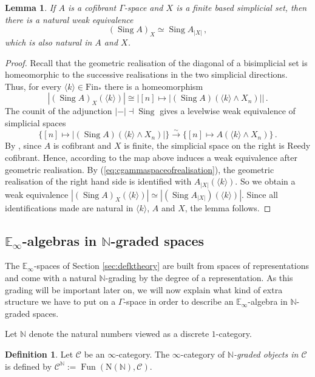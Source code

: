 \documentclass[oneside, a4paper, 12pt]{article}
\numberwithin{equation}{section}
\DeclareMathOperator{\Sing}{Sing}
\DeclareMathOperator{\Fun}{Fun}
\newcommand{\Fin}{\mathrm{Fin}}
\newcommand{\N}{\mathbb{N}}
\theoremstyle{plain}
\newtheorem{lemma}[theorem]{Lemma}
\theoremstyle{definition}
\newtheorem{definition}[theorem]{Definition}
\theoremstyle{remark}
\begin{document}
\begin{lemma} \label{lem:singular}
If $A$ is a cofibrant $\Gamma$-space and $X$ is a finite based simplicial set, then there is a natural weak equivalence
\[
(\Sing A)_X \simeq \Sing A_{|X|}\, ,
\]
which is also natural in $A$ and $X$.
\end{lemma}
\begin{proof}
Recall that the geometric realisation of the diagonal of a bisimplicial set is homeomorphic to the successive realisations in the two simplicial directions. Thus, for every $\langle k\rangle\in \Fin_\ast$ there is a homeomorphism
\[
|(\Sing A)_X(\langle k\rangle)|\cong |[n]\mapsto |(\Sing A)(\langle k\rangle\wedge X_n)||\, .
\]
The counit of the adjunction $|-|\dashv \Sing$ gives a levelwise weak equivalence of simplicial spaces
\[
\{ [n]\mapsto |(\Sing A)(\langle k\rangle\wedge X_n)|\} \xrightarrow{\sim} \{[n] \mapsto A(\langle k\rangle\wedge X_n)\}\, .
\]
By \cite[Proposition B.37]{Global}, since $A$ is cofibrant and $X$ is finite, the simplicial space on the right is Reedy cofibrant. Hence, according to \cite[Proposition A.44]{Global} the map above induces a weak equivalence after geometric realisation. By (\ref{eq:cgammaspaceofrealisation}), the geometric realisation of the right hand side is identified with $A_{|X|}(\langle k\rangle)$. So we obtain a weak equivalence $|(\Sing A)_X(\langle k\rangle)|\simeq |(\Sing A_{|X|})(\langle k\rangle)|$. Since all identifications made are natural in $\langle k\rangle$, $A$ and $X$, the lemma follows.
\end{proof}


\subsection{$\mathbb{E}_\infty$-algebras in $\N$-graded spaces} \label{sec:graded}

The $\mathbb{E}_\infty$-spaces of Section \ref{sec:defktheory} are built from spaces of representations and come with a natural $\N$-grading by the degree of a representation. As this grading will be important later on, we will now explain what kind of extra structure we have to put on a $\Gamma$-space in order to describe an $\mathbb{E}_\infty$-algebra in $\N$-graded spaces.

Let $\N$ denote the natural numbers viewed as a discrete $1$-category.

\begin{definition} \label{def:gradedobjects}
Let $\mathcal{C}$ be an $\infty$-category. The $\infty$-category of \emph{$\N$-graded objects in $\mathcal{C}$} is defined by $\mathcal{C}^\N:=\Fun(\mathrm{N}(\N),\mathcal{C})$.
\end{definition}
\end{document}
